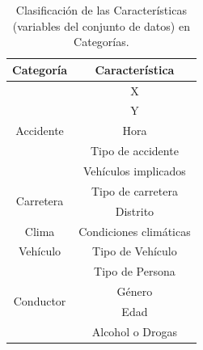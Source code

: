 \documentclass{uathesis-es}
\begin{document}
{%



\begin{table}[H]
    \centering

        \begin{tabular}{ |c|c| }
            \hline
            \textbf{Categoría} & \textbf{Característica} \\
            \hline
            \hline
            \multirow{5}{*}{Accidente} & X \\
                                       & Y \\
                                       & Hora \\
                                       & Tipo de accidente \\
                                       & Vehículos implicados \\
            \hline
            \hline
            \multirow{2}{*}{Carretera} & Tipo de carretera \\
                                       & Distrito \\
            \hline
            \hline
            Clima & Condiciones climáticas \\
            \hline
            \hline
            Vehículo & Tipo de Vehículo \\
            \hline
            \hline
            \multirow{4}{*}{Conductor}  & Tipo de Persona \\
                                        & Género \\
                                          & Edad \\
                                        & Alcohol o Drogas \\
            \hline
            \hline
        \end{tabular}

    \caption{Clasificación de las Características (variables del conjunto de datos) en Categorías.}
    \label{JC}
\end{table}



}
\end{document}
